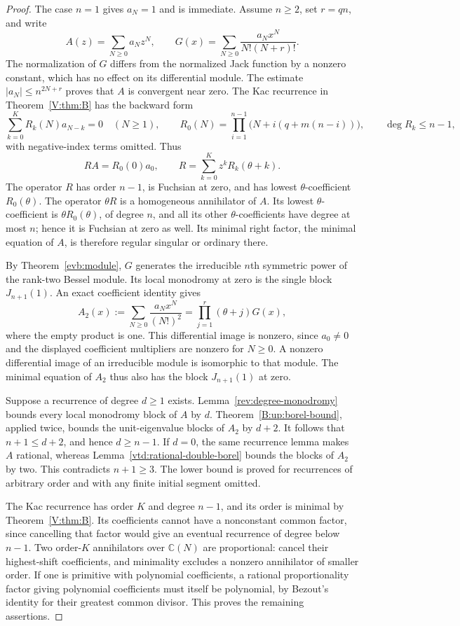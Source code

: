 \documentclass[11pt,a4paper]{article}
\theoremstyle{definition}
\theoremstyle{remark}
\numberwithin{equation}{section}
\begin{document}
\begin{proof}
The case $n=1$ gives $a_N=1$ and is immediate.  Assume $n\ge2$, set
$r=qn$, and write
\[
 A(z)=\sum_{N\ge0}a_Nz^N,\qquad
 G(x)=\sum_{N\ge0}\frac{a_Nx^N}{N!(N+r)!}.
\]
The normalization of $G$ differs from the normalized Jack function
by a nonzero constant, which has no effect on its differential module.
The estimate $|a_N|\le n^{2N+r}$ proves that $A$ is convergent near zero.
The Kac recurrence in Theorem~\ref{V:thm:B} has the backward form
\[
 \sum_{k=0}^K R_k(N)a_{N-k}=0\quad(N\ge1),\qquad
 R_0(N)=\prod_{i=1}^{n-1}\bigl(N+i(q+m(n-i))\bigr),
 \qquad \deg R_k\le n-1,
\]
with negative-index terms omitted.  Thus
\[
 R A=R_0(0)a_0,\qquad
 R=\sum_{k=0}^K z^kR_k(\theta+k).
\]
The operator $R$ has order $n-1$, is Fuchsian at zero, and has lowest
$\theta$-coefficient $R_0(\theta)$.  The operator $\theta R$ is a
homogeneous annihilator of $A$.  Its lowest $\theta$-coefficient is
$\theta R_0(\theta)$, of degree $n$, and all its other
$\theta$-coefficients have degree at most $n$; hence it is Fuchsian
at zero as well.  Its minimal right factor, the minimal equation of
$A$, is therefore regular singular or ordinary there.

By Theorem~\ref{evb:module}, $G$ generates the irreducible
$n$th symmetric power of the rank-two Bessel module.  Its local
monodromy at zero is the single block $J_{n+1}(1)$.  An exact
coefficient identity gives
\begin{equation}\label{vtd:double-borel-identity}
 A_2(x):=\sum_{N\ge0}\frac{a_Nx^N}{(N!)^2}
       =\prod_{j=1}^{r}(\theta+j)G(x),
\end{equation}
where the empty product is one.  This differential image is nonzero,
since $a_0\ne0$ and the displayed coefficient multipliers are nonzero
for $N\ge0$.  A nonzero differential image of an irreducible module
is isomorphic to that module.  The minimal equation of $A_2$ thus
also has the block $J_{n+1}(1)$ at zero.

Suppose a recurrence of degree $d\ge1$ exists.
Lemma~\ref{rev:degree-monodromy} bounds every local monodromy block
of $A$ by $d$.  Theorem~\ref{B:up:borel-bound}, applied twice,
bounds the unit-eigenvalue blocks of $A_2$ by $d+2$.  It follows that
$n+1\le d+2$, and hence $d\ge n-1$.
If $d=0$, the same recurrence lemma makes $A$ rational, whereas
Lemma~\ref{vtd:rational-double-borel} bounds the blocks of $A_2$
by two.  This contradicts $n+1\ge3$.  The lower bound is proved
for recurrences of arbitrary order and with any finite initial segment
omitted.

The Kac recurrence has order $K$ and degree $n-1$, and its order is
minimal by Theorem~\ref{V:thm:B}.  Its coefficients cannot have a
nonconstant common factor, since cancelling that factor would give an
eventual recurrence of degree below $n-1$.  Two order-$K$
annihilators over $\mathbb C(N)$ are proportional: cancel their
highest-shift coefficients, and minimality excludes a nonzero
annihilator of smaller order.  If one is primitive with polynomial
coefficients, a rational proportionality factor giving polynomial
coefficients must itself be polynomial, by Bezout's identity for their
greatest common divisor.  This proves the remaining assertions.
\end{proof}
\end{document}
